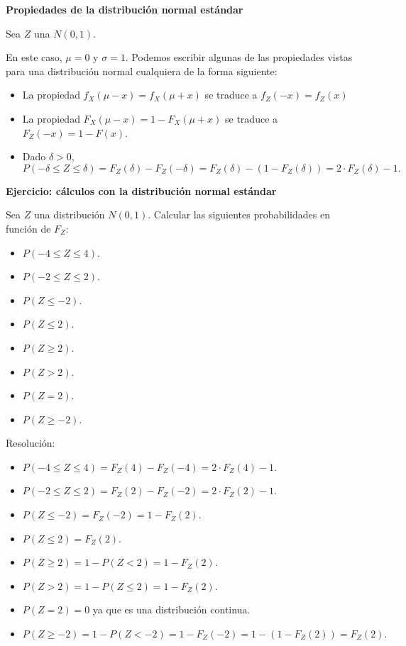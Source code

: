 \documentclass[
  letterpaper,
  DIV=11,
  numbers=noendperiod]{scrreprt}
\providecommand{\tightlist}{%
  \setlength{\itemsep}{0pt}\setlength{\parskip}{0pt}}\usepackage{longtable,booktabs,array}
\begin{document}
\textbf{Propiedades de la distribución normal estándar}

Sea \(Z\) una \(N(0,1)\).

En este caso, \(\mu=0\) y \(\sigma=1\). Podemos escribir algunas de las
propiedades vistas para una distribución normal cualquiera de la forma
siguiente:

\begin{itemize}
\tightlist
\item
  La propiedad \(f_X(\mu-x)=f_X(\mu+x)\) se traduce a \(f_Z(-x)=f_Z(x)\)
\item
  La propiedad \(F_X(\mu-x)=1-F_X(\mu+x)\) se traduce a
  \(F_Z(-x)=1-F(x).\)
\item
  Dado \(\delta>0\), \[
  P(-\delta\leq Z \leq \delta)=F_{Z}(\delta)-F_{Z}(-\delta)=F_Z(\delta)-(1-F_Z(\delta))=
  2\cdot F_Z(\delta)-1.
  \]
\end{itemize}

\textbf{Ejercicio: cálculos con la distribución normal estándar}

Sea \(Z\) una distribución \(N(0,1)\). Calcular las siguientes
probabilidades en función de \(F_Z\):

\begin{itemize}
\tightlist
\item
  \(P(-4\leq Z \leq 4).\)
\item
  \(P(-2\leq Z \leq 2).\)
\item
  \(P(Z\leq -2).\)
\item
  \(P( Z \leq 2).\)
\item
  \(P( Z \geq 2).\)
\item
  \(P( Z > 2).\)
\item
  \(P( Z = 2).\)
\item
  \(P( Z \geq -2).\)
\end{itemize}

Resolución:

\begin{itemize}
\tightlist
\item
  \(P(-4\leq Z \leq 4)=F_{Z}(4)-F_{Z}(-4)=2\cdot F_Z(4)-1\).
\item
  \(P(-2\leq Z \leq 2)=F_{Z}(2)-F_{Z}(-2)=2\cdot F_Z(2)-1\).
\item
  \(P(Z\leq -2)=F_Z(-2)=1-F_Z(2)\).
\item
  \(P( Z \leq 2)=F_{Z}(2)\).
\item
  \(P( Z \geq 2)=1-P(Z<2)=1-F_{Z}(2)\).
\item
  \(P( Z > 2)=1-P(Z\leq 2)=1-F_{Z}(2)\).
\item
  \(P( Z = 2)=0\) ya que es una distribución continua.
\item
  \(P( Z \geq -2)=1-P(Z< -2)=1-F_{Z}(-2)=1-(1-F_Z(2))=F_Z(2).\)
\end{itemize}
\end{document}
